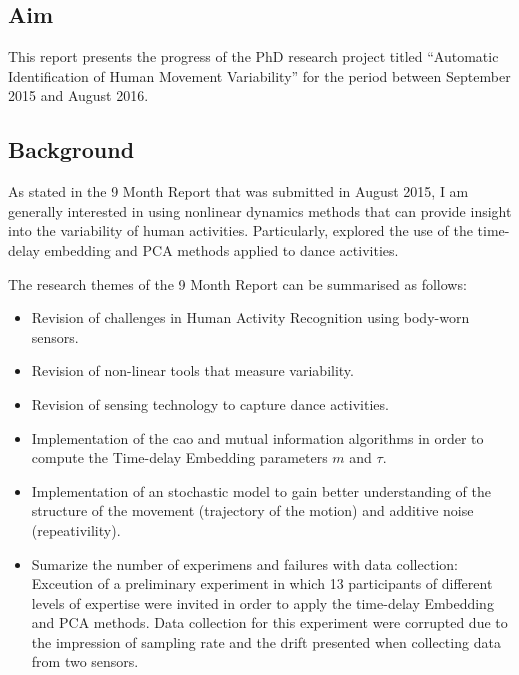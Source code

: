 \documentclass[10pt,journal,onecolumn,compsoc]{IEEEtran}
\begin{document}

\subsection{Aim}

This report presents the progress of the PhD research project titled
``Automatic Identification of Human Movement Variability'' 
for the period between September 2015 and August 2016.

\subsection{Background}
As stated in the 9 Month Report that was submitted in August 2015,
I am generally interested in using nonlinear dynamics methods 
that can provide insight into the variability of human activities.
Particularly, explored the use of the time-delay embedding and PCA methods
applied to dance activities. 

The research themes of the 9 Month Report can be summarised as follows:

\begin{itemize}
 \item Revision of challenges in Human Activity Recognition using body-worn sensors.
 \item Revision of non-linear tools that measure variability.
 \item Revision of sensing technology to capture dance activities.
 \item Implementation of the cao and mutual information algorithms in order 
    to compute the Time-delay Embedding parameters $m$ and $\tau$.
 \item Implementation of an stochastic model to gain better understanding of the 
 structure of the movement (trajectory of the motion) and additive noise (repeativility).
 \item Sumarize the number of experimens and failures with data collection: 
 Exceution of a preliminary experiment in which 13 participants of different levels of 
 expertise were invited in order to apply the time-delay Embedding and PCA methods.
 Data collection for this experiment were corrupted due to the impression of sampling rate
 and the drift presented when collecting data from two sensors.
\end{itemize}
\end{document}
